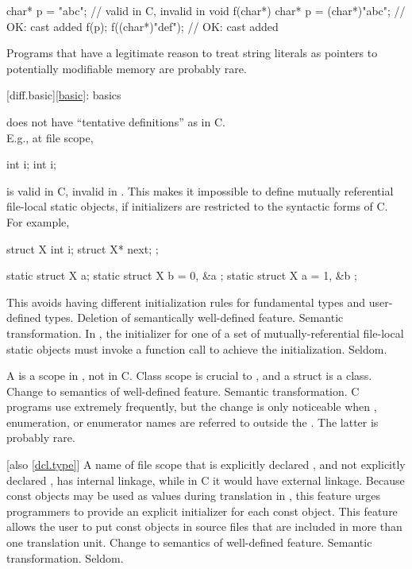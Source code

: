 \begin{codeblock}
char* p = "abc";                // valid in C, invalid in \Cpp{}
void f(char*) {
  char* p = (char*)"abc";       // OK: cast added
  f(p);
  f((char*)"def");              // OK: cast added
}
\end{codeblock}

\howwide
Programs that have a legitimate reason to treat string literals
as pointers to potentially modifiable memory are probably rare.

[diff.basic]{\ref{basic}: basics}

\change \Cpp{} does not have ``tentative definitions'' as in C.\\
E.g., at file scope,

\begin{codeblock}
int i;
int i;
\end{codeblock}

is valid in C, invalid in \Cpp{}.
This makes it impossible to define
mutually referential file-local static objects, if initializers are
restricted to the syntactic forms of C\@.
For example,

\begin{codeblock}
struct X { int i; struct X* next; };

static struct X a;
static struct X b = { 0, &a };
static struct X a = { 1, &b };
\end{codeblock}

\rationale
This avoids having different initialization rules for
fundamental types and user-defined types.
\effect
Deletion of semantically well-defined feature.
\difficulty
Semantic transformation.
In \Cpp{}, the initializer for one of a set of
mutually-referential file-local static objects must invoke a function
call to achieve the initialization.
\howwide
Seldom.

\change A  is a scope in \Cpp{}, not in C.
\rationale
Class scope is crucial to \Cpp{}, and a struct is a class.
\effect
Change to semantics of well-defined feature.
\difficulty
Semantic transformation.
\howwide
C programs use  extremely frequently, but the
change is only noticeable when , enumeration, or enumerator
names are referred to outside the .
The latter is probably rare.

 [also \ref{dcl.type}]
\change A name of file scope that is explicitly declared , and not explicitly
declared , has internal linkage, while in C it would have external linkage.
\rationale
Because const objects may be used as values during translation in
\Cpp{}, this feature urges programmers to provide an explicit initializer
for each const object.
This feature allows the user to put const objects in source files that are included
in more than one translation unit.
\effect
Change to semantics of well-defined feature.
\difficulty
Semantic transformation.
\howwide
Seldom.

